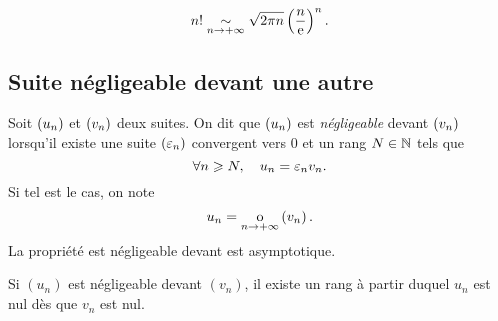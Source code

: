 \documentclass{magnolia}
\begin{document}





\begin{proposition}[nom={{\sc Stirling}}]
\[n!\underset{n\rightarrow +\infty}{\sim}\sqrt{2\pi n}\left(\frac{n}{{\rm e}}\right)^n.\]
\end{proposition}

\subsection{Suite négligeable devant une autre}

\begin{definition}[utile=-3]
Soit $\left(u_n\right)$ et $\left(v_n\right)$ deux suites. On dit que $\left(u_n\right)$ est \emph{négligeable}
devant $\left(v_n\right)$ lorsqu'il existe une suite $\left(\varepsilon_n\right)$ convergent vers 0 et
un rang $N\in\mathbb{N}$ tels que
\[\forall n\geqslant N ,\quad u_n=\varepsilon_n v_n.\]
Si tel est le cas, on note
\[u_n=\underset{n \rightarrow +\infty}{\text{o}}\left(v_n\right).\]
La propriété \og est négligeable devant \fg est asymptotique.
\end{definition}

\begin{remarqueUnique}
\remarque Si $(u_n)$ est négligeable devant $(v_n)$, il existe un rang à partir
  duquel $u_n$ est nul dès que $v_n$ est nul.
\end{remarqueUnique}
\end{document}
